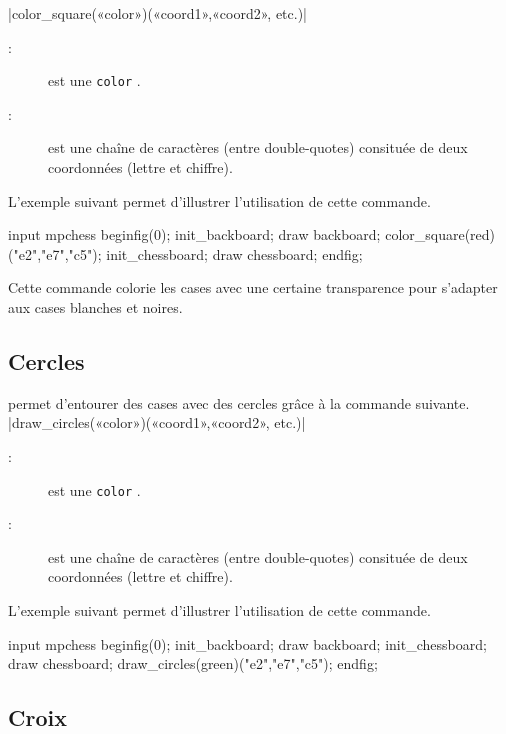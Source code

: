 \documentclass[french]{ltxdoc}
\begin{document}
\commande|color_square(«color»)(«coord1»,«coord2», etc.)|\smallskip

\begin{description}
\item[:] est une \lstinline+color+ \MP.
\item[:] est une chaîne de caractères (entre double-quotes) consituée de deux coordonnées (lettre et chiffre).
\end{description}

L’exemple suivant permet d’illustrer l’utilisation de cette commande.

\begin{ExempleMP}
input mpchess
beginfig(0);
init_backboard;
draw backboard;
color_square(red)("e2","e7","c5");
init_chessboard;
draw chessboard;
endfig;
\end{ExempleMP}

Cette commande colorie les cases avec une certaine transparence pour s’adapter
aux cases blanches et noires.

\subsection{Cercles}
\mpchess permet d’entourer des cases avec des cercles grâce à la commande
suivante.
\commande|draw_circles(«color»)(«coord1»,«coord2», etc.)|\smallskip

\begin{description}
\item[:] est une \lstinline+color+ \MP.
\item[:] est une chaîne de caractères (entre double-quotes) consituée de deux coordonnées (lettre et chiffre).
\end{description}

L’exemple suivant permet d’illustrer l’utilisation de cette commande.

\begin{ExempleMP}
input mpchess
beginfig(0);
init_backboard;
draw backboard;
init_chessboard;
draw chessboard;
draw_circles(green)("e2","e7","c5");
endfig;
\end{ExempleMP}



\subsection{Croix}
\end{document}
